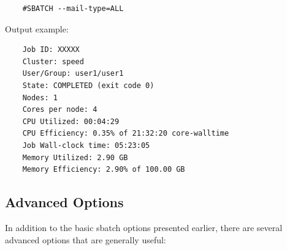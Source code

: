 \begin{itemize}
	\small
	\begin{verbatim}
	#SBATCH --mail-type=ALL        
	\end{verbatim}
	\normalsize

	Output example:
	\small
	\begin{verbatim}
	Job ID: XXXXX
	Cluster: speed
	User/Group: user1/user1
	State: COMPLETED (exit code 0)
	Nodes: 1
	Cores per node: 4
	CPU Utilized: 00:04:29
	CPU Efficiency: 0.35% of 21:32:20 core-walltime
	Job Wall-clock time: 05:23:05
	Memory Utilized: 2.90 GB
	Memory Efficiency: 2.90% of 100.00 GB
	\end{verbatim}
	\normalsize
\end{itemize}


\subsection{Advanced  Options}
\label{sect:submit-options}
\label{sect:qsub-options}

In addition to the basic sbatch options presented earlier, 
there are several advanced options that are generally useful:

